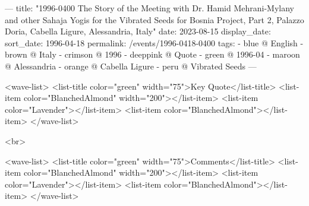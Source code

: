 ---
title: "1996-0400 The Story of the Meeting with Dr. Hamid Mehrani-Mylany and other Sahaja Yogis for the Vibrated Seeds for Bosnia Project, Part 2, Palazzo Doria, Cabella Ligure, Alessandria, Italy"
date: 2023-08-15
display_date: 
sort_date: 1996-04-18
permalink: /events/1996-0418-0400
tags:
  - blue @ English
  - brown @ Italy
  - crimson @ 1996
  - deeppink @ Quote
  - green @ 1996-04
  - maroon @ Alessandria
  - orange @ Cabella Ligure
  - peru @ Vibrated Seeds
---

<wave-list>
  <list-title color="green" width="75">Key Quote</list-title>
  <list-item color="BlanchedAlmond"  width="200"></list-item>
  <list-item color="Lavender"></list-item>
  <list-item color="BlanchedAlmond"></list-item>
</wave-list>

<br>

<wave-list>
  <list-title color="green" width="75">Comments</list-title>
  <list-item color="BlanchedAlmond"  width="200"></list-item>
  <list-item color="Lavender"></list-item>
  <list-item color="BlanchedAlmond"></list-item>
</wave-list>